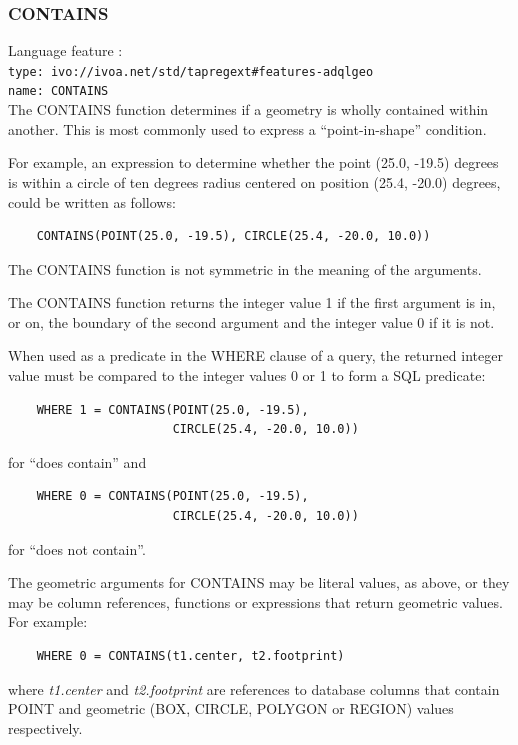 \documentclass[11pt,a4paper]{ivoa}
\begin{document}
\subsubsection{CONTAINS}
\label{sec:functions.geom.contains}
{\footnotesize Language feature :}\\
{\footnotesize \verb|type: ivo://ivoa.net/std/tapregext#features-adqlgeo|}\\
{\footnotesize \verb|name: CONTAINS|}\\

The CONTAINS function determines if a geometry is wholly contained within
another. This is most commonly used to express a ``point-in-shape'' condition.

For example, an expression to determine whether the point (25.0, -19.5) degrees
is within a circle of ten degrees radius centered on position (25.4, -20.0)
degrees, could be written as follows:
\begin{verbatim}
    CONTAINS(POINT(25.0, -19.5), CIRCLE(25.4, -20.0, 10.0))
\end{verbatim}

The CONTAINS function is not symmetric in the meaning of the arguments.

The CONTAINS function returns the integer value 1 if the first argument
is in, or on, the boundary of the second argument and the integer value 0
if it is not.

When used as a predicate in the WHERE clause of a query, the returned integer
value must be compared to the integer values 0 or 1 to form a SQL predicate:
\begin{verbatim}
    WHERE 1 = CONTAINS(POINT(25.0, -19.5),
                       CIRCLE(25.4, -20.0, 10.0))
\end{verbatim}
\noindent
for ``does contain'' and
\begin{verbatim}
    WHERE 0 = CONTAINS(POINT(25.0, -19.5),
                       CIRCLE(25.4, -20.0, 10.0))
\end{verbatim}
\noindent
for ``does not contain''.


The geometric arguments for CONTAINS may be literal values, as above,
or they may be column references, functions or expressions that return
geometric values.
For example:
\begin{verbatim}
    WHERE 0 = CONTAINS(t1.center, t2.footprint)
\end{verbatim}
where \textit{t1.center} and \textit{t2.footprint} are references to
database columns that contain POINT and geometric (BOX, CIRCLE, POLYGON or REGION)
values respectively.
\end{document}
